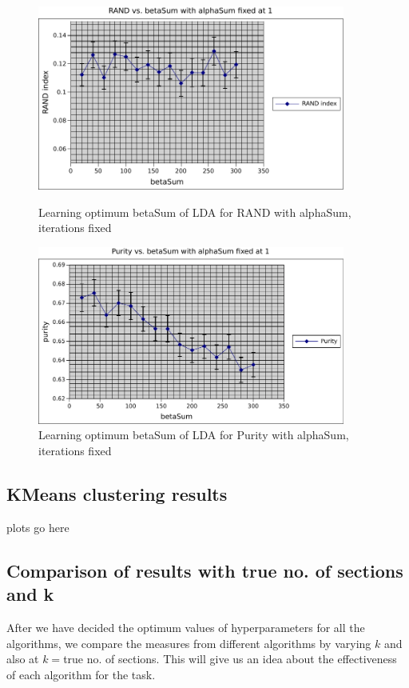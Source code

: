 \begin{figure}
    \centering
    \begin{minipage}{0.45\textwidth}
        \centering
        \includegraphics[width=0.9\textwidth]{betaSum_rand_lda.pdf}
        \caption{Learning optimum betaSum of LDA for RAND with alphaSum, iterations fixed}
    \end{minipage}\hfill
    \begin{minipage}{0.45\textwidth}
        \centering
        \includegraphics[width=0.9\textwidth]{betaSum_purity_lda.pdf}
        \caption{Learning optimum betaSum of LDA for Purity with alphaSum, iterations fixed}
    \end{minipage}
\end{figure}
\subsection{KMeans clustering results} plots go here
\subsection{Comparison of results with true no. of sections and k} After we have decided the optimum values of hyperparameters for all the algorithms, we compare the measures from different algorithms by varying $k$ and also at $k = $true no. of sections. This will give us an idea about the effectiveness of each algorithm for the task.

